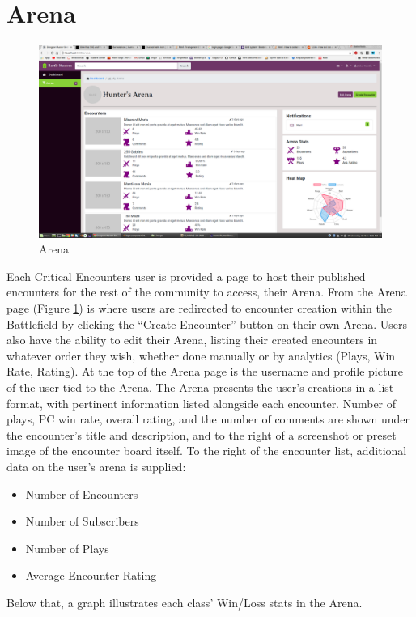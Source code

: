 \documentclass[12pt,a4paper]{report}
\begin{document}
	\section{Arena}
	\begin{figure}[H]
		\centering
		\includegraphics[scale=.20]{arena}
		\caption{Arena}
		\label{fig: Arena}
	\end{figure}
	Each Critical Encounters user is provided a page to host their published encounters for the rest of the community to access, their Arena. From the Arena page (Figure \ref{fig: Arena}) is where users are redirected to encounter creation within the Battlefield by clicking the ``Create Encounter'' button on their own Arena. Users also have the ability to edit their Arena, listing their created encounters in whatever order they wish, whether done manually or by analytics (Plays, Win Rate, Rating). At the top of the Arena page is the username and profile picture of the user tied to the Arena. The Arena presents the user's creations in a list format, with pertinent information listed alongside each encounter. Number of plays, PC win rate, overall rating, and the number of comments are shown under the encounter's title and description, and to the right of a screenshot or preset image of the encounter board itself. To the right of the encounter list, additional data on the user's arena is supplied: 
	\begin{multicols}{2}
		\begin{itemize}
			\item Number of Encounters
			\item Number of Subscribers
			\item Number of Plays
			\item Average Encounter Rating
		\end{itemize}
	\end{multicols}
	\noindent Below that, a graph illustrates each class' Win/Loss stats in the Arena.
	\newpage
\end{document}
